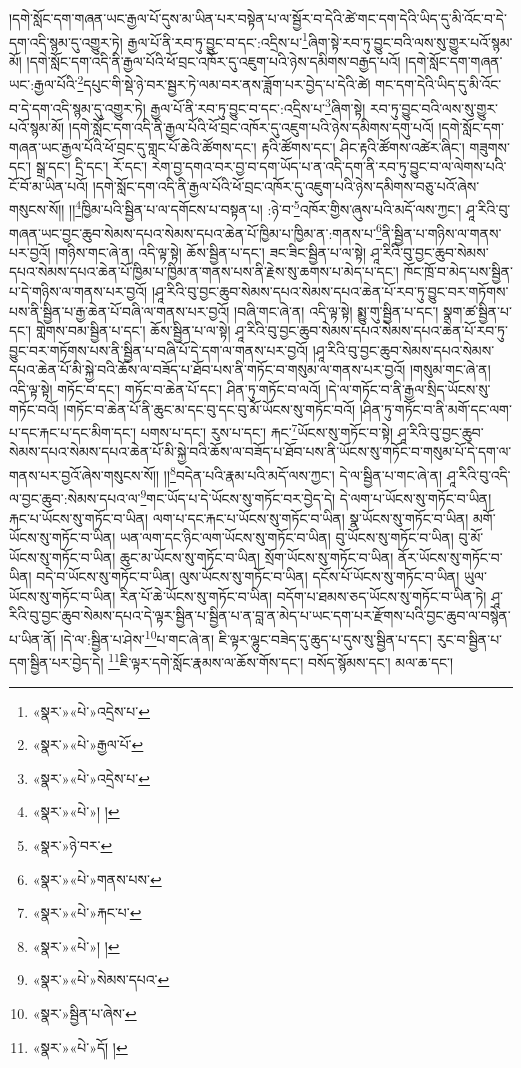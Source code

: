 །དགེ་སློང་དག་གཞན་ཡང་རྒྱལ་པོ་དུས་མ་ཡིན་པར་བསྟེན་པ་ལ་སྦྱོར་བ་དེའི་ཚེ་གང་དག་དེའི་ཡིད་དུ་མི་འོང་བ་དེ་དག་འདི་སྙམ་དུ་འགྱུར་ཏེ། རྒྱལ་པོ་ནི་རབ་ཏུ་བྱུང་བ་དང་:འདྲིས་པ་\footnote{«སྣར་»«པེ་»འདྲེས་པ་}ཞིག་སྟེ་རབ་ཏུ་བྱུང་བའི་ལས་སུ་གྱུར་པའོ་སྙམ་མོ། །དགེ་སློང་དག་འདི་ནི་རྒྱལ་པོའི་ཕོ་བྲང་འཁོར་དུ་འཇུག་པའི་ཉེས་དམིགས་བརྒྱད་པའོ། །དགེ་སློང་དག་གཞན་ཡང་:རྒྱལ་པོའི་\footnote{«སྣར་»«པེ་»རྒྱལ་པོ་}དཔུང་གི་སྡེ་ཉེ་བར་སྦྱར་ཏེ་ལམ་བར་ནས་ཟློག་པར་བྱེད་པ་དེའི་ཚེ། གང་དག་དེའི་ཡིད་དུ་མི་འོང་བ་དེ་དག་འདི་སྙམ་དུ་འགྱུར་ཏེ། རྒྱལ་པོ་ནི་རབ་ཏུ་བྱུང་བ་དང་:འདྲིས་པ་\footnote{«སྣར་»«པེ་»འདྲེས་པ་}ཞིག་སྟེ། རབ་ཏུ་བྱུང་བའི་ལས་སུ་གྱུར་པའོ་སྙམ་མོ། །དགེ་སློང་དག་འདི་ནི་རྒྱལ་པོའི་ཕོ་བྲང་འཁོར་དུ་འཇུག་པའི་ཉེས་དམིགས་དགུ་པའོ། །དགེ་སློང་དག་གཞན་ཡང་རྒྱལ་པོའི་ཕོ་བྲང་དུ་གླང་པོ་ཆེའི་ཚོགས་དང་། རྟའི་ཚོགས་དང་། ཤིང་རྟའི་ཚོགས་འཚེར་ཞིང་། གཟུགས་དང་། སྒྲ་དང་། དྲི་དང་། རོ་དང་། རེག་བྱ་དགའ་བར་བྱ་བ་དག་ཡོད་པ་ན་འདི་དག་ནི་རབ་ཏུ་བྱུང་བ་ལ་ལེགས་པའི་ངོ་བོ་མ་ཡིན་པའོ། །དགེ་སློང་དག་འདི་ནི་རྒྱལ་པོའི་ཕོ་བྲང་འཁོར་དུ་འཇུག་པའི་ཉེས་དམིགས་བཅུ་པའོ་ཞེས་གསུངས་སོ།། །།\footnote{«སྣར་»«པེ་»། །}ཁྱིམ་པའི་སྦྱིན་པ་ལ་དགོངས་པ་བསྟན་པ། :ཉེ་བ་\footnote{«སྣར་»ཉེ་བར་}འཁོར་གྱིས་ཞུས་པའི་མདོ་ལས་ཀྱང་། ཤཱ་རིའི་བུ་གཞན་ཡང་བྱང་ཆུབ་སེམས་དཔའ་སེམས་དཔའ་ཆེན་པོ་ཁྱིམ་པ་ཁྱིམ་ན་:གནས་པ་\footnote{«སྣར་»«པེ་»གནས་པས་}ནི་སྦྱིན་པ་གཉིས་ལ་གནས་པར་བྱའོ། །གཉིས་གང་ཞེ་ན། འདི་ལྟ་སྟེ། ཆོས་སྦྱིན་པ་དང་། ཟང་ཟིང་སྦྱིན་པ་ལ་སྟེ། ཤཱ་རིའི་བུ་བྱང་ཆུབ་སེམས་དཔའ་སེམས་དཔའ་ཆེན་པོ་ཁྱིམ་པ་ཁྱིམ་ན་གནས་པས་ནི་རྗེས་སུ་ཆགས་པ་མེད་པ་དང་། ཁོང་ཁྲོ་བ་མེད་པས་སྦྱིན་པ་དེ་གཉིས་ལ་གནས་པར་བྱའོ། །ཤཱ་རིའི་བུ་བྱང་ཆུབ་སེམས་དཔའ་སེམས་དཔའ་ཆེན་པོ་རབ་ཏུ་བྱུང་བར་གཏོགས་པས་ནི་སྦྱིན་པ་རྒྱ་ཆེན་པོ་བཞི་ལ་གནས་པར་བྱའོ། །བཞི་གང་ཞེ་ན། འདི་ལྟ་སྟེ། སྨྱུ་གུ་སྦྱིན་པ་དང་། སྣག་ཚ་སྦྱིན་པ་དང་། གླེགས་བམ་སྦྱིན་པ་དང་། ཆོས་སྦྱིན་པ་ལ་སྟེ། ཤཱ་རིའི་བུ་བྱང་ཆུབ་སེམས་དཔའ་སེམས་དཔའ་ཆེན་པོ་རབ་ཏུ་བྱུང་བར་གཏོགས་པས་ནི་སྦྱིན་པ་བཞི་པོ་དེ་དག་ལ་གནས་པར་བྱའོ། །ཤཱ་རིའི་བུ་བྱང་ཆུབ་སེམས་དཔའ་སེམས་དཔའ་ཆེན་པོ་མི་སྐྱེ་བའི་ཆོས་ལ་བཟོད་པ་ཐོབ་པས་ནི་གཏོང་བ་གསུམ་ལ་གནས་པར་བྱའོ། །གསུམ་གང་ཞེ་ན། འདི་ལྟ་སྟེ། གཏོང་བ་དང་། གཏོང་བ་ཆེན་པོ་དང་། ཤིན་ཏུ་གཏོང་བ་ལའོ། །དེ་ལ་གཏོང་བ་ནི་རྒྱལ་སྲིད་ཡོངས་སུ་གཏོང་བའོ། །གཏོང་བ་ཆེན་པོ་ནི་ཆུང་མ་དང་བུ་དང་བུ་མོ་ཡོངས་སུ་གཏོང་བའོ། །ཤིན་ཏུ་གཏོང་བ་ནི་མགོ་དང་ལག་པ་དང་རྐང་པ་དང་མིག་དང་། པགས་པ་དང་། རུས་པ་དང་། རྐང་\footnote{«སྣར་»«པེ་»རྐང་པ་}ཡོངས་སུ་གཏོང་བ་སྟེ། ཤཱ་རིའི་བུ་བྱང་ཆུབ་སེམས་དཔའ་སེམས་དཔའ་ཆེན་པོ་མི་སྐྱེ་བའི་ཆོས་ལ་བཟོད་པ་ཐོབ་པས་ནི་ཡོངས་སུ་གཏོང་བ་གསུམ་པོ་དེ་དག་ལ་གནས་པར་བྱའོ་ཞེས་གསུངས་སོ།། །།\footnote{«སྣར་»«པེ་»། །}བདེན་པའི་རྣམ་པའི་མདོ་ལས་ཀྱང་། དེ་ལ་སྦྱིན་པ་གང་ཞེ་ན། ཤཱ་རིའི་བུ་འདི་ལ་བྱང་ཆུབ་:སེམས་དཔའ་ལ་\footnote{«སྣར་»«པེ་»སེམས་དཔའ་}གང་ཡོད་པ་དེ་ཡོངས་སུ་གཏོང་བར་བྱེད་དེ། དེ་ལག་པ་ཡོངས་སུ་གཏོང་བ་ཡིན། རྐང་པ་ཡོངས་སུ་གཏོང་བ་ཡིན། ལག་པ་དང་རྐང་པ་ཡོངས་སུ་གཏོང་བ་ཡིན། སྣ་ཡོངས་སུ་གཏོང་བ་ཡིན། མགོ་ཡོངས་སུ་གཏོང་བ་ཡིན། ཡན་ལག་དང་ཉིང་ལག་ཡོངས་སུ་གཏོང་བ་ཡིན། བུ་ཡོངས་སུ་གཏོང་བ་ཡིན། བུ་མོ་ཡོངས་སུ་གཏོང་བ་ཡིན། ཆུང་མ་ཡོངས་སུ་གཏོང་བ་ཡིན། སྲོག་ཡོངས་སུ་གཏོང་བ་ཡིན། ནོར་ཡོངས་སུ་གཏོང་བ་ཡིན། བདེ་བ་ཡོངས་སུ་གཏོང་བ་ཡིན། ལུས་ཡོངས་སུ་གཏོང་བ་ཡིན། དངོས་པོ་ཡོངས་སུ་གཏོང་བ་ཡིན། ཡུལ་ཡོངས་སུ་གཏོང་བ་ཡིན། རིན་པོ་ཆེ་ཡོངས་སུ་གཏོང་བ་ཡིན། བདོག་པ་ཐམས་ཅད་ཡོངས་སུ་གཏོང་བ་ཡིན་ཏེ། ཤཱ་རིའི་བུ་བྱང་ཆུབ་སེམས་དཔའ་དེ་ལྟར་སྦྱིན་པ་སྦྱིན་པ་ན་བླ་ན་མེད་པ་ཡང་དག་པར་རྫོགས་པའི་བྱང་ཆུབ་ལ་བསྙེན་པ་ཡིན་ནོ། །དེ་ལ་:སྦྱིན་པ་ཤེས་\footnote{«སྣར་»སྦྱིན་པ་ཞེས་}པ་གང་ཞེ་ན། ཇི་ལྟར་ལྷུང་བཟེད་དུ་ཆུད་པ་དུས་སུ་སྦྱིན་པ་དང་། རུང་བ་སྦྱིན་པ་དག་སྦྱིན་པར་བྱེད་དེ། \footnote{«སྣར་»«པེ་»དོ། ། }ཇི་ལྟར་དགེ་སློང་རྣམས་ལ་ཆོས་གོས་དང་། བསོད་སྙོམས་དང་། མལ་ཆ་དང་། 